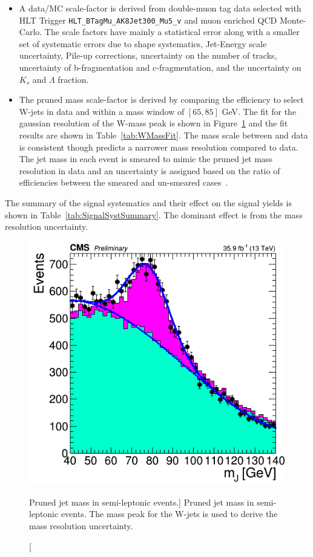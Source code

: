 \begin{itemize}
\item A data/MC  scale-factor is derived from double-muon tag data selected with HLT Trigger \texttt{HLT\_BTagMu\_AK8Jet300\_Mu5\_v} and muon enriched QCD Monte-Carlo. The scale factors have mainly a statistical error along with a smaller set of systematic errors due to shape systematics, Jet-Energy scale uncertainty, Pile-up corrections, uncertainty on the number of tracks, uncertainty of b-fragmentation and  c-fragmentation, and the uncertainty on $K_{s}$ and $\Lambda$ fraction. 
\item The pruned mass scale-factor is derived by comparing the efficiency to select W-jets in data and  within a mass window of $\left[65,85\right]$ GeV.  The fit for the gaussian resolution of the W-mass peak is shown in Figure~\ref{fig:WMassPeak} and the fit results are shown in Table~\ref{tab:WMassFit}. The mass scale between  and data is consistent though  predicts a narrower mass resolution compared to data. The jet mass in each event is smeared to mimic the pruned jet mass resolution in data and an uncertainty is assigned based on the ratio of efficiencies between the smeared and un-smeared cases~\cite{CMS_AN_2016-215}.
\end{itemize} 

The summary of the signal systematics and their effect on the signal yields is shown in Table~\ref{tab:SignalSystSummary}. The dominant effect is from the mass resolution uncertainty.

\begin{figure}
\begin{center}
\includegraphics[width=0.5\linewidth]{figs/WMassPeakDataMC.png}
\end{center}
\caption
[Pruned jet mass in semi-leptonic \ttbar events.]
{Pruned jet mass in semi-leptonic \ttbar events. The mass peak for the W-jets is used to derive the mass resolution uncertainty. \cite{boostedan}}
\label{fig:WMassPeak}
\end{figure}

